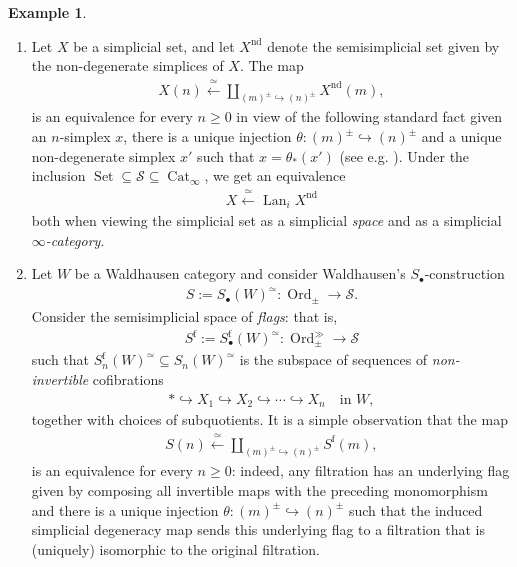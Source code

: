\documentclass[12pt, reqno]{amsart}
\theoremstyle{plain}
\theoremstyle{definition}
\newtheorem{example}[theorem]{Example}
\begin{document}
\begin{example}\label{examples: picking out the non-degenerate simplices} \ 
\begin{enumerate}
\item Let $X$ be a simplicial set, and let $X^{\operatorname{nd}}$ denote the semisimplicial set given by the non-degenerate simplices of $X$. The map
\begin{align*}
X(n)\xleftarrow{ \ \simeq \ } \coprod_{(m)^\pm \hookrightarrow (n)^\pm}X^{\operatorname{nd}}(m),
\end{align*}
is an equivalence for every $n\geq 0$ in view of the following standard fact given an $n$-simplex $x$, there is a unique injection $\theta\colon (m)^\pm \hookrightarrow (n)^\pm$ and a unique non-degenerate simplex $x'$ such that $x=\theta_*(x')$ (see e.g. \cite[Proposition 1.1.3.4]{kerodon}). Under the inclusion $\operatorname{Set}\subseteq \mathcal{S}\subseteq \operatorname{Cat}_\infty$, we get an equivalence
\begin{align*}
X\xleftarrow{\ \simeq \ } \operatorname{Lan}_i X^{\operatorname{nd}}
\end{align*}
both when viewing the simplicial set as a simplicial \textit{space} and as a simplicial \textit{$\infty$-category}.
\item Let $W$ be a Waldhausen category and consider Waldhausen's $S_\bullet$-construction
\begin{align*}
S:=S_\bullet(W)^\simeq\colon \operatorname{Ord}_\pm\rightarrow \mathcal{S}.
\end{align*}
Consider the semisimplicial space of \textit{flags}: that is,
\begin{align*}
S^{\operatorname{f}}:=S^{\operatorname{f}}_\bullet(W)^\simeq\colon \operatorname{Ord}_\pm^\gg\rightarrow \mathcal{S}
\end{align*}
such that $S^{\operatorname{f}}_n(W)^\simeq\subseteq S_n(W)^\simeq$ is the subspace of sequences of \textit{non-invertible} cofibrations
\begin{align*}
\ast\hookrightarrow X_1\hookrightarrow X_2\hookrightarrow \cdots \hookrightarrow X_n\quad \text{in }W,
\end{align*}
together with choices of subquotients. It is a simple observation that the map
\begin{align*}
S(n)\xleftarrow{ \ \simeq \ } \coprod_{(m)^\pm \hookrightarrow (n)^\pm}S^{\operatorname{f}}(m),
\end{align*}
is an equivalence for every $n\geq 0$: indeed, any filtration has an underlying flag given by composing all invertible maps with the preceding monomorphism and there is a unique injection $\theta\colon (m)^\pm \hookrightarrow (n)^\pm$ such that the induced simplicial degeneracy map sends this underlying flag to a filtration that is (uniquely) isomorphic to the original filtration.\qedhere
\end{enumerate}
\end{example}
\end{document}
